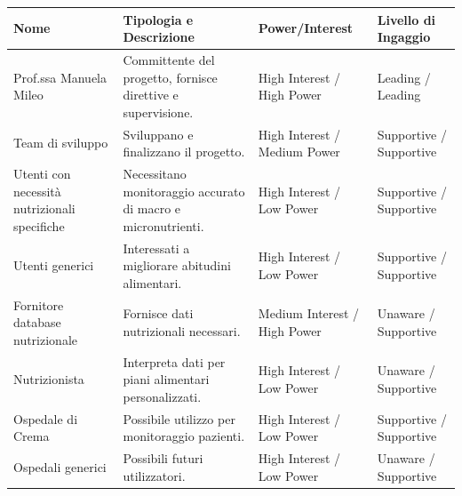 \documentclass[11pt,a4paper]{article}
\begin{document}
    \begin{longtable}{|p{3cm}|p{4cm}|p{3cm}|p{4cm}|}
        \hline
        \textbf{Nome} & \textbf{Tipologia e Descrizione} & \textbf{Power/Interest} & \textbf{Livello di Ingaggio} \\
        \hline

        Prof.ssa Manuela Mileo & Committente del progetto, fornisce direttive e supervisione. & High Interest / High Power & Leading / Leading \\
        \hline

        Team di sviluppo & Sviluppano e finalizzano il progetto. & High Interest / Medium Power & Supportive / Supportive \\
        \hline

        Utenti con necessità nutrizionali specifiche & Necessitano monitoraggio accurato di macro e micronutrienti. & High Interest / Low Power & Supportive / Supportive \\
        \hline

        Utenti generici & Interessati a migliorare abitudini alimentari. & High Interest / Low Power & Supportive / Supportive \\
        \hline

        Fornitore database nutrizionale & Fornisce dati nutrizionali necessari. & Medium Interest / High Power & Unaware / Supportive \\
        \hline

        Nutrizionista & Interpreta dati per piani alimentari personalizzati. & High Interest / Low Power & Unaware / Supportive \\
        \hline

        Ospedale di Crema & Possibile utilizzo per monitoraggio pazienti. & High Interest / Low Power & Supportive / Supportive \\
        \hline

        Ospedali generici & Possibili futuri utilizzatori. & High Interest / Low Power & Unaware / Supportive \\
        \hline

    \end{longtable}
\end{document}
